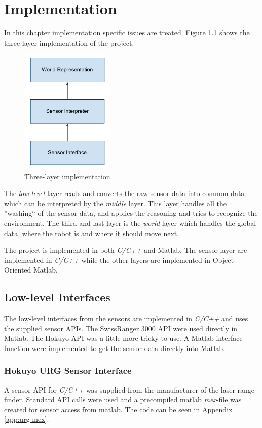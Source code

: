 
\chapter{Implementation}
\label{chap6}
In this chapter implementation specific issues are treated. Figure
\ref{chap6:fig-implementation} shows the three-layer implementation of the project.
\begin{figure}[htbp]
    \centering
    \includegraphics[width=0.4\textwidth]{pics/implementation}
    \caption{Three-layer implementation}
    \label{chap6:fig-implementation}
\end{figure}
The \emph{low-level} layer reads and converts the raw sensor data into common data which can be
interpreted by the \emph{middle} layer. This layer handles all the ''washing`` of the
sensor data, and applies the reasoning and tries to recognize the environment. The third
and last layer is the \emph{world} layer which handles the global data, where the robot is
and where it should move next. 

The project is implemented in both \emph{C/C++} and Matlab. The sensor layer are
implemented in \emph{C/C++} while the other layers are implemented in Object-Oriented
Matlab.

\section{Low-level Interfaces}
The low-level interfaces from the sensors are implemented in \emph{C/C++} and uses the
supplied sensor APIs. The SwissRanger 3000 API were used directly in Matlab. The Hokuyo
API was a little more tricky to use. A Matlab interface function were implemented to get
the sensor data directly into Matlab.

\subsection{Hokuyo URG Sensor Interface}
A sensor API for \emph{C/C++} was supplied from the manufacturer of the laser range
finder. Standard API calls were used and a precompiled matlab \emph{mex}-file was created
for sensor access from matlab. The code can be seen in Appendix \ref{app:urg-mex}.

